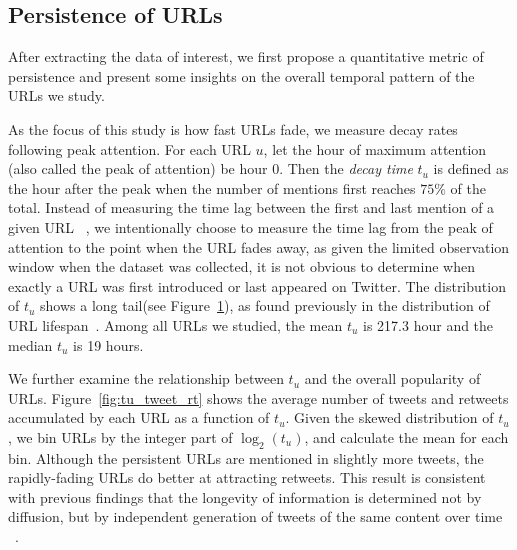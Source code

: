 \documentclass[phd,tocprelim]{cornell}
\renewcommand{\caption}[1]{\singlespacing\hangcaption{#1}\normalspacing}
\begin{document}
\subsection{Persistence of URLs}
After extracting the data of interest, we first propose a quantitative metric of persistence and present some insights on the overall temporal pattern of the URLs we study.

As the focus of this study is how fast URLs fade, we measure decay rates following peak attention. 
For each URL $u$, let the hour of maximum attention (also called
the peak of attention) be hour $0$. 
Then the {\em decay time} $t_u$ is defined as the hour after the peak 
when the number of mentions first reaches $75\%$ of the total.
Instead of measuring the time lag between the first and last mention of a given URL ~\cite{Wu-Twitter-2011}, we intentionally choose to measure the time lag from the peak of attention to the point when the URL fades away, as given the limited observation window when the dataset was collected, it is not obvious to determine when exactly a URL was first introduced or last appeared on Twitter.
The distribution of $t_u$ shows a long tail(see Figure~\ref{fig:tu_distribution}), as found previously in the distribution of URL lifespan~\cite{Wu-Twitter-2011}.
Among all URLs we studied, the mean $t_u$ is 217.3  hour and the median $t_u$ is 19 hours.

\begin{figure}[htb!]
\centering
{}
\caption{Distribution of URL decay time $t_u$}
\label{fig:tu_distribution}
\end{figure}

We further examine the relationship between $t_u$ and the overall popularity of URLs. Figure~\ref{fig:tu_tweet_rt} shows the average number of tweets and retweets accumulated by each URL as a function of $t_u$. Given the skewed distribution of $t_u$, we bin URLs by the integer part of $\log_2(t_u)$, and calculate the mean for each bin.  Although the persistent URLs are mentioned in slightly more tweets, the rapidly-fading URLs do better at attracting retweets. This result is consistent with previous findings that the longevity of information is determined not by diffusion, but by independent generation of tweets of the same content over time ~\cite{Wu-Twitter-2011}.
\end{document}
